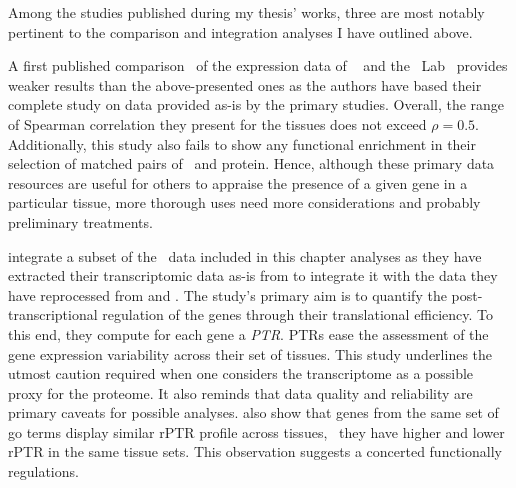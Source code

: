 Among the studies published during my thesis' works,
three are most notably pertinent to the comparison and integration analyses
I have outlined above.\mybr\

A first published comparison~ of the expression data of
\gtex\  and the \pandey\ Lab~
provides weaker results than the above-presented ones
as the authors have based their complete study on data provided as-is
by the primary studies.
Overall, the range of Spearman correlation they present for the tissues
does not exceed $\rho=0.5$.
Additionally, this study also fails to show any functional enrichment
in their selection of matched pairs of \mRNA\ and protein.
Hence, although these primary data resources are useful
for others to appraise the presence of a given gene in a particular tissue,
more thorough uses need more considerations
and probably preliminary treatments.\mybr\

\citet{Franks2017-bp} integrate a subset of the \uhlen\ data included
in this chapter analyses
as they have extracted their transcriptomic data as-is from \citet{Uhlen2014}
to integrate it with the data they have reprocessed
from \citet{PandeyData} and \citet{KusterData}.
The study's primary aim is
to quantify the post-transcriptional regulation of the genes
through their translational efficiency.
To this end, they compute for each gene a \emph{\gls{PTR}}.
\glspl{PTR} ease the assessment of the gene expression variability
across their set of tissues.
This study underlines the utmost caution required
when one considers the transcriptome as a possible proxy for the proteome.
It also reminds that data quality and reliability are primary caveats
for possible analyses.
\citet{Franks2017-bp} also show that genes from the same set of \gls{go} terms
display similar \gls{rPTR} profile across tissues,
\ie\ they have higher and lower \gls{rPTR} in the same tissue sets.
This observation suggests a concerted functionally regulations.\mybr\

